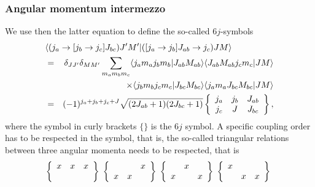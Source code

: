 \documentclass[compress]{beamer}
\begin{document}
\frame
{
\frametitle{Angular momentum intermezzo}
\begin{small}
{\scriptsize
We use then the latter equation to define the so-called $6j$-symbols
\begin{eqnarray}
\nonumber
\lefteqn{ \langle (j_a\rightarrow [j_b\rightarrow j_c]J_{bc}) J'M'| ([j_a\rightarrow j_b]J_{ab}\rightarrow j_c) JM\rangle } \\ \nonumber
&= & \delta_{JJ'}\delta_{MM'}\sum_{m_am_bm_c}\langle j_am_aj_bm_b|J_{ab}M_{ab}\rangle \langle J_{ab}M_{ab}j_cm_c|JM\rangle \\ \nonumber
& &  \times \langle j_bm_bj_cm_c|J_{bc}M_{bc}\rangle \langle j_am_aJ_{bc}M_{bc}|JM\rangle  \\ \nonumber
&= & (-1)^{j_a+j_b+j_c+J}\sqrt{(2J_{ab}+1)(2J_{bc}+1)}\left\{\begin{array}{ccc} j_a & j_b& J_{ab} \\ j_c & J & J_{bc} \end{array}\right\}
, \nonumber
\end{eqnarray}
where the symbol in curly brackets $\{\}$ is the $6j$ symbol. 
A specific coupling order has to be respected in the symbol, that is, the so-called triangular relations between three angular momenta needs to be respected, that is 
\[
\left\{\begin{array}{ccc} x & x& x \\  &  &  \end{array}\right\}\hspace{0.1cm}\left\{\begin{array}{ccc}  & & x \\  x& x &  \end{array}\right\}\hspace{0.1cm}\left\{\begin{array}{ccc}  & x&  \\ x &  &x  \end{array}\right\}\hspace{0.1cm}\left\{\begin{array}{ccc} x & &  \\  & x &x  \end{array}\right\}\hspace{0.1cm}
\]
}
\end{small}
}
\end{document}
